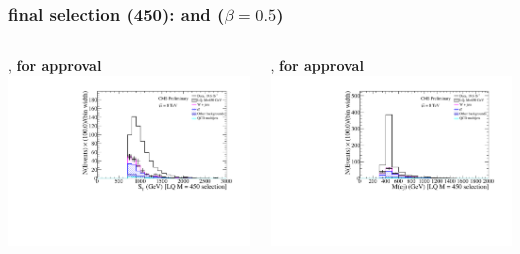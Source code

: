\documentclass[bigger]{beamer}
\providecommand{\alert}[1]{\textbf{#1}}
\begin{document}
\begin{frame}
\frametitle{\enujj final selection (450): \ST and \mej ($\beta = 0.5$)}
\label{sec-3-4-2}
\begin{columns}
\begin{column}{0.6\textwidth}
\label{sec-3-4-2-1}

\centering
\ST, \alert{for approval}
\includegraphics[width=\textwidth]{fig/enu/finalSelection/sT_LQ450_enujj.pdf}
\end{column}
\begin{column}{0.6\textwidth}
\label{sec-3-4-2-2}

\centering
\mej, \alert{for approval}
\includegraphics[width=\textwidth]{fig/enu/finalSelection/Mej_LQ450_enujj.pdf}
\end{column}
\end{columns}
\end{frame}
\end{document}
